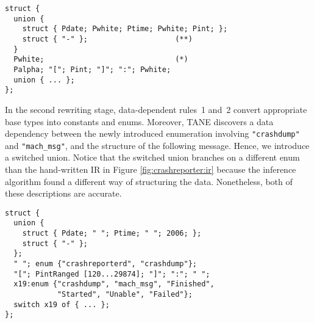{\small
\begin{verbatim}
struct {
  union {
    struct { Pdate; Pwhite; Ptime; Pwhite; Pint; };
    struct { "-" };                    (**)
  }
  Pwhite;                              (*)
  Palpha; "["; Pint; "]"; ":"; Pwhite; 
  union { ... };
};
\end{verbatim}
}



In the second rewriting stage, 
data-dependent rules~1 and~2 convert appropriate base types into 
constants and enums.
Moreover, TANE discovers a data dependency between the
newly introduced enumeration involving {\tt "crashdump"} and
{\tt "mach\_msg"}, and the structure of the following message.
Hence, we introduce a switched union.
Notice that the switched union branches on a different enum 
than the hand-written IR in Figure \ref{fig:crashreporter:ir}
because the inference algorithm found a different way of structuring
the data. Nonetheless, both of these descriptions are accurate.


{\small
\begin{verbatim}
struct {
  union {
    struct { Pdate; " "; Ptime; " "; 2006; };
    struct { "-" };
  };
  " "; enum {"crashreporterd", "crashdump"};
  "["; PintRanged [120...29874]; "]"; ":"; " ";
  x19:enum {"crashdump", "mach_msg", "Finished", 
            "Started", "Unable", "Failed"};
  switch x19 of { ... };
};
\end{verbatim}
}



